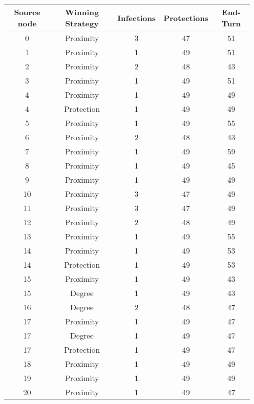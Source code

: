 \documentclass[results.tex]{subfiles}
\begin{document}
\begin{center}
  \begin{tabular}{| c || c | c | c | c |}
    \hline
    {\bfseries Source node} & {\bfseries Winning Strategy} & {\bfseries Infections} & {\bfseries Protections} & {\bfseries End-Turn} \\  %
    \hline\hline
    0 & Proximity & 3 & 47 & 51 \\ 
    \hline
    1 & Proximity & 1 & 49 & 51 \\ 
    \hline
    2 & Proximity & 2 & 48 & 43 \\ 
    \hline
    3 & Proximity & 1 & 49 & 51 \\ 
    \hline
    4 & Proximity & 1 & 49 & 49 \\ 
    \hline
    4 & Protection & 1 & 49 & 49 \\ 
    \hline
    5 & Proximity & 1 & 49 & 55 \\ 
    \hline
    6 & Proximity & 2 & 48 & 43 \\ 
    \hline
    7 & Proximity & 1 & 49 & 59 \\ 
    \hline
    8 & Proximity & 1 & 49 & 45 \\ 
    \hline
    9 & Proximity & 1 & 49 & 49 \\ 
    \hline
    10 & Proximity & 3 & 47 & 49 \\ 
    \hline
    11 & Proximity & 3 & 47 & 49 \\ 
    \hline
    12 & Proximity & 2 & 48 & 49 \\ 
    \hline
    13 & Proximity & 1 & 49 & 55 \\ 
    \hline
    14 & Proximity & 1 & 49 & 53 \\ 
    \hline
    14 & Protection & 1 & 49 & 53 \\ 
    \hline
    15 & Proximity & 1 & 49 & 43 \\ 
    \hline
    15 & Degree & 1 & 49 & 43 \\ 
    \hline
    16 & Degree & 2 & 48 & 47 \\ 
    \hline
    17 & Proximity & 1 & 49 & 47 \\ 
    \hline
    17 & Degree & 1 & 49 & 47 \\ 
    \hline
    17 & Protection & 1 & 49 & 47 \\ 
    \hline
    18 & Proximity & 1 & 49 & 49 \\ 
    \hline
    19 & Proximity & 1 & 49 & 49 \\ 
    \hline
    20 & Proximity & 1 & 49 & 47 \\ 

\end{tabular}
\end{center}
\end{document}
